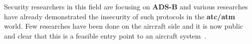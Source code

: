 \documentclass[../main.tex]{subfiles}
\begin{document}
Security researchers in this field are focusing on \textbf{ADS-B} and various researches \cite{costin2012ghost,renderman} have already demonstrated the insecurity of such protocols in the \textbf{\acrshort{atc}/\acrshort{atm}} world. Few researches have been done on the aircraft side and it is now public and clear that this is a feasible entry point to an aircraft system~\cite{news-boeinghack-cso}.
\end{document}
